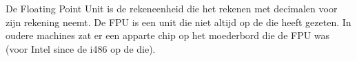 De Floating Point Unit is de rekeneenheid die het rekenen met decimalen voor zijn rekening neemt. De FPU is een unit die niet altijd op de die heeft gezeten. In oudere machines zat er een apparte chip op het moederbord die de FPU was (voor Intel since de i486 op de die).


